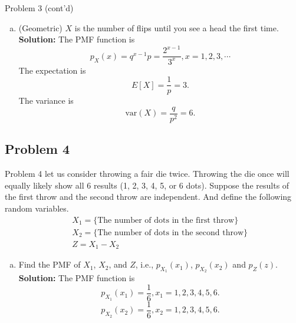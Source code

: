 \documentclass{beamer}
\begin{document}
\begin{frame}{Problem 3 (cont'd)}
    \begin{enumerate}[(c)]
        \item (Geometric) $X$ is the number of flips until you see a head the first time. \\
             {\bf Solution:} The PMF function is \[p_X(x)=q^{x-1}p = \frac{2^{x-1}}{3^x}, x=1,2,3, \cdots\]
            The expectation is \[E[X] = \frac{1}{p} = 3.\]
            The variance is \[\text{var}(X)= \frac{q}{p^2} = 6.\]
    \end{enumerate}
\end{frame}

\subsection{Problem 4}
\begin{frame}{Problem 4}
let us consider throwing a fair die twice. Throwing the die once will equally likely show all 6 results (1, 2, 3, 4, 5, or 6 dots).
         Suppose the results of the first throw and the second throw are independent. And define the
         following random variables.
         \begin{eqnarray}
         && X_1 = \{\text{The number of dots in the first throw}\} \nonumber \\
         && X_2 = \{\text{The number of dots in the second throw}\} \nonumber \\
         && Z = X_1 - X_2 \nonumber
         \end{eqnarray}
        \vspace{-0.5cm}
        \begin{enumerate}[(a)]
            \item Find the PMF of $X_1$, $X_2$, and $Z$, i.e., $p_{X_1}(x_1)$, $p_{X_2}(x_2)$ and $p_{Z}(z)$. \\
            {\bf Solution:} The PMF function is
            \[p_{X_1}(x_1) = \frac{1}{6}, x_1 = 1,2,3,4,5,6.\]
            \[p_{X_2}(x_2) = \frac{1}{6}, x_2 = 1,2,3,4,5,6.\]
        \end{enumerate}
\end{frame}
\end{document}
